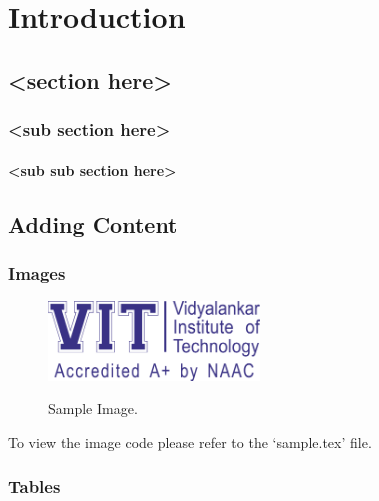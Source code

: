 \chapter{Introduction}

\section{<section here>}

\subsection{<sub section here>}

\blindtext

\subsubsection{<sub sub section here>}

\blindtext


\section{Adding Content}

\subsection{Images}

\begin{figure}[ht]
    \begin{center}
        \includegraphics[width=0.50\textwidth]{./vit-logo.png}\\[0.5cm]
        \caption{Sample Image.}
        \label{fig:sample-image}
    \end{center}
\end{figure}

\noindent To view the image code please refer to the `sample.tex' file.

\subsection{Tables}

